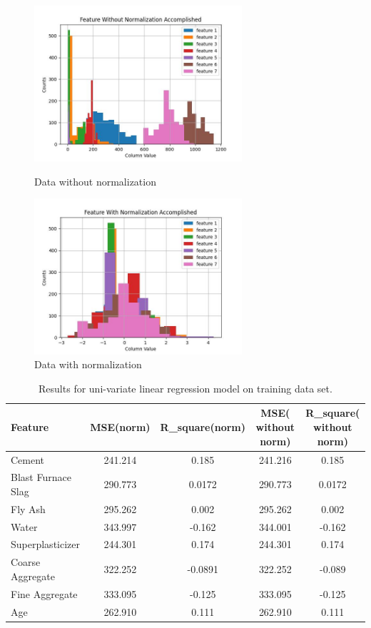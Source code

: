 \documentclass{article}
\begin{document}
\begin{figure}[htbp]
    \centering
    \begin{minipage}[t]{0.49\textwidth}
        \centering
        \includegraphics[width=7.7cm]{images/without_norm.jpg}
        \caption{Data without normalization}
        \label{fig:no_norm}
    \end{minipage}
    \begin{minipage}[t]{0.49\textwidth}
        \centering
        \includegraphics[width=7.7cm]{images/with_norm.jpg}
        \caption{Data with normalization}
        \label{fig:norm}
    \end{minipage}
\end{figure}



\begin{table}[htbp]
\centering
\begin{tabular}{|l|c|c|c|c|}
\hline
Feature & MSE(norm) & R\_square(norm) & MSE( without norm) & R\_square( without norm)\\
\hline
Cement & 241.214 & 0.185 & 241.216 & 0.185\\
\hline
Blast Furnace Slag & 290.773 & 0.0172  & 290.773 & 0.0172\\
\hline
Fly Ash & 295.262 & 0.002  & 295.262 & 0.002 \\
\hline
Water  & 343.997 & -0.162 & 344.001 & -0.162\\
\hline
Superplasticizer & 244.301 & 0.174 & 244.301 & 0.174\\
\hline
Coarse Aggregate  & 322.252 & -0.0891 & 322.252 & -0.089\\
\hline
Fine Aggregate &  333.095 & -0.125 & 333.095 & -0.125\\
\hline
Age  & 262.910 & 0.111 & 262.910 &  0.111 \\

 
\hline
\end{tabular}
\caption{\label{tab:train_uni}Results for uni-variate linear regression model on training data set.}
\end{table}
\end{document}

